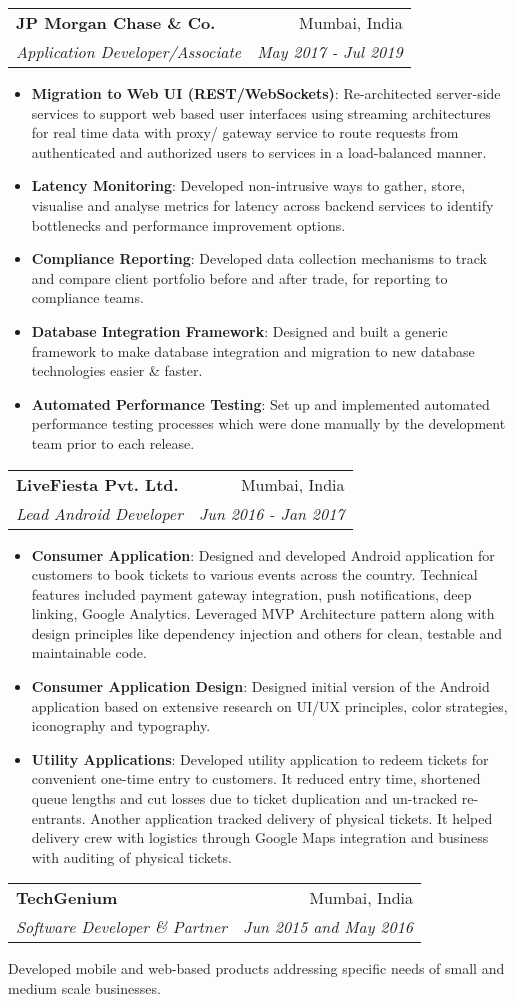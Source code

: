 \documentclass[letterpaper,11pt]{article}
\makeatletter
\newcommand{\resumeItem}[2]{
	\item\normalsize{
		\textbf{#1}{: #2}
	}
}
\newcommand{\resumeSubheading}[4]{
	\vspace{-2pt}\item
	\begin{tabular*}{0.97\textwidth}[t]{l@{\extracolsep{\fill}}r}
		\textbf{#1} & #2 \\
		\textit{\small#3} & \textit{\small #4} \\
	\end{tabular*}\vspace{-2pt}
}
\newcommand{\resumeItemListStart}{\begin{itemize}}
\newcommand{\resumeItemListEnd}{\end{itemize}\vspace{-5pt}}
\makeatother
\begin{document}
	\resumeSubheading
	{JP Morgan Chase \& Co.}{Mumbai, India}
	{Application Developer/Associate}{May 2017 - Jul 2019}
	\resumeItemListStart
	\resumeItem{Migration to Web UI (REST/WebSockets)}
	{Re-architected server-side services to support web based user interfaces using streaming architectures for real time data with proxy/ gateway service to route requests from authenticated and authorized users to services in a load-balanced manner.}
	\resumeItem{Latency Monitoring}
	{Developed non-intrusive ways to gather, store, visualise and analyse metrics for latency across backend services to identify bottlenecks and performance improvement options.}
	\resumeItem{Compliance Reporting}
	{Developed data collection mechanisms to track and compare client portfolio before and after trade, for reporting to compliance teams.}
	\resumeItem{Database Integration Framework}
	{Designed and built a generic framework to make database integration and migration to new database technologies easier \& faster.}
	\resumeItem{Automated Performance Testing}
	{Set up and implemented automated performance testing processes which were done manually by the development team prior to each release.}
	\resumeItemListEnd
	
	\resumeSubheading
	{LiveFiesta Pvt. Ltd.}{Mumbai, India}
	{Lead Android Developer}{Jun 2016 - Jan 2017}
	\resumeItemListStart
	\resumeItem{Consumer Application}
	{Designed and developed Android application for customers to book tickets to various events across the country. Technical features included payment gateway integration, push notifications, deep linking, Google Analytics. Leveraged MVP Architecture pattern along with design principles like dependency injection and others for clean, testable and maintainable code.}
	\resumeItem{Consumer Application Design}
	{Designed initial version of the Android application based on extensive research on UI/UX principles, color strategies, iconography and typography.}
	\resumeItem{Utility Applications}
	{Developed utility application to redeem tickets for convenient one-time entry to customers. It reduced entry time, shortened queue lengths and cut losses due to ticket duplication and un-tracked re-entrants. Another application tracked delivery of physical tickets. It helped delivery crew with logistics through Google Maps integration and business with auditing of physical tickets.}
	\resumeItemListEnd
	
	\resumeSubheading
	{TechGenium}{Mumbai, India}
	{Software Developer \& Partner}{Jun 2015 and May 2016}
	
	\vspace{2mm}
	Developed mobile and web-based products addressing specific needs of small and medium scale businesses. %
	
\end{document}
